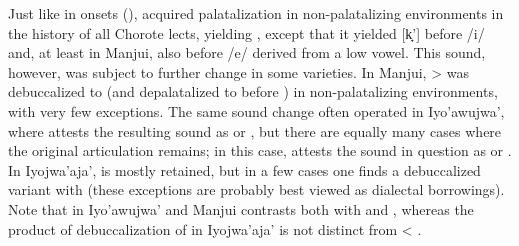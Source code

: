 Just like  in onsets (),  acquired palatalization in non-palatalizing environments in the history of all Chorote lects, yielding , except that it yielded [k̟’] before /i/ and, at least in Manjui, also before /e/ derived from a low vowel. This  sound, however, was subject to further change in some varieties. In Manjui,  >  was debuccalized to  (and depalatalized to  before ) in non-palatalizing environments, with very few exceptions. The same sound change often operated in Iyo’awujwa’, where \citet{AG83} attests the resulting sound as  or , but there are equally many cases where the original articulation remains; in this case, \citet{AG83} attests the sound in question as  or . In Iyojwa’aja’,  is mostly retained, but in a few cases one finds a debuccalized variant with  (these exceptions are probably best viewed as dialectal borrowings). Note that in Iyo’awujwa’ and Manjui  contrasts both with  and , whereas the product of debuccalization of  in Iyojwa’aja’ is not distinct from  < .

\begin{exe}\label{chorote-kj'-ex}
    \ex {}
    \ex {}
    \ex {}
    \ex {}
    \ex {}
    \ex {}
    \ex {}
    \ex {}
    \ex {}
    \ex {}
    \ex {}
    \ex {}
    \ex {}
    \ex {}
    \ex {}
    \ex {}
\end{exe}

